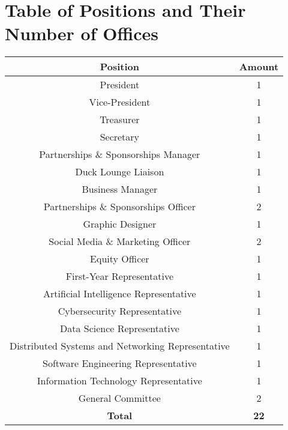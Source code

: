 \documentclass{schedule}
\begin{document}
\section{Table of Positions and Their Number of Offices}\label{appendix:tablePositions}
\begin{center}
    \vspace{1em}
    \def\arraystretch{1.1}
    \begin{tabular}{c|c}
        \textbf{Position}                                 & \textbf{Amount} \\
        \hline
        President                                         & 1               \\
        Vice-President                                    & 1               \\
        Treasurer                                         & 1               \\
        Secretary                                         & 1               \\
        Partnerships \& Sponsorships Manager              & 1               \\
        Duck Lounge Liaison                               & 1               \\
        Business Manager                                  & 1               \\
        Partnerships \& Sponsorships Officer              & 2               \\
        Graphic Designer                                  & 1               \\
        Social Media \& Marketing Officer                 & 2               \\
        Equity Officer                                    & 1               \\
        First-Year Representative                         & 1               \\
        Artificial Intelligence Representative            & 1               \\
        Cybersecurity Representative                      & 1               \\
        Data Science Representative                       & 1               \\
        Distributed Systems and Networking Representative & 1               \\
        Software Engineering Representative               & 1               \\
        Information Technology Representative             & 1               \\
        General Committee                                 & 2               \\
        \hline
        \textbf{Total}                                    & \textbf{22}
    \end{tabular}
\end{center}

\newpage

\end{document}
